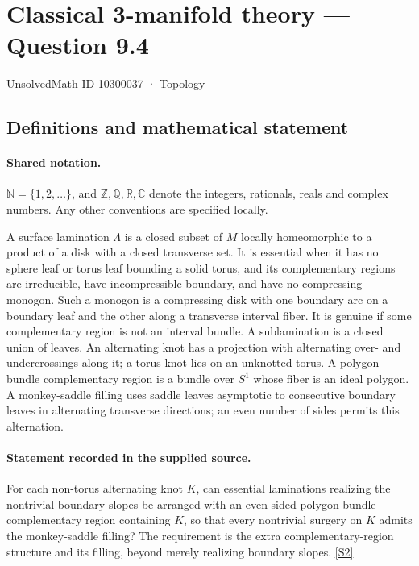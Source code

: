 \documentclass[11pt]{article}
\newcommand{\sref}[2]{\hyperlink{source:#1:#2}{[S#2]}}
\begin{document}
\setcounter{section}{10300036}
\section{Classical 3-manifold theory — Question 9.4}\label{10300037}
{\small\sffamily UnsolvedMath ID 10300037 · Topology}
\subsection{Definitions and mathematical statement}

\paragraph{Shared notation.}$\mathbb N=\{1,2,\ldots\}$, and $\mathbb Z,\mathbb Q,\mathbb R,\mathbb C$ denote the integers, rationals, reals and complex numbers. Any other conventions are specified locally.


A surface lamination $\Lambda$ is a closed subset of $M$ locally homeomorphic to a product of a disk with a closed transverse set. It is essential when it has no sphere leaf or torus leaf bounding a solid torus, and its complementary regions are irreducible, have incompressible boundary, and have no compressing monogon. Such a monogon is a compressing disk with one boundary arc on a boundary leaf and the other along a transverse interval fiber. It is genuine if some complementary region is not an interval bundle. A sublamination is a closed union of leaves. An alternating knot has a projection with alternating over- and undercrossings along it; a torus knot lies on an unknotted torus. A polygon-bundle complementary region is a bundle over $S^1$ whose fiber is an ideal polygon. A monkey-saddle filling uses saddle leaves asymptotic to consecutive boundary leaves in alternating transverse directions; an even number of sides permits this alternation.
\paragraph{Statement recorded in the supplied source.}
For each non-torus alternating knot $K$, can essential laminations realizing the nontrivial boundary slopes be arranged with an even-sided polygon-bundle complementary region containing $K$, so that every nontrivial surgery on $K$ admits the monkey-saddle filling? The requirement is the extra complementary-region structure and its filling, beyond merely realizing boundary slopes. \sref{10300037}{2}
\end{document}
